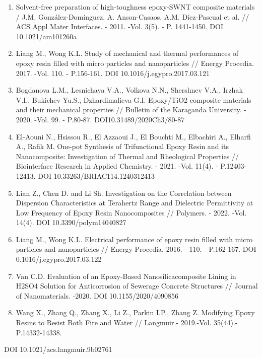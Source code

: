 \begin{enumerate}
\def\labelenumi{\arabic{enumi}.}
\setcounter{enumi}{4}
\item
  Solvent-free preparation of high-toughness epoxy-SWNT composite
  materials / J.M. González-Domínguez, A. Anson-Casaos, A.M.
  Díez-Pascual et al. // ACS Appl Mater Interfaces. - 2011. -Vol. 3(5).
  - P. 1441-1450. DOI 10.1021/am101260a
\item
  Liang M., Wong K.L. Study of mechanical and thermal performances of
  epoxy resin filled with micro particles and nanoparticles // Energy
  Procedia. 2017. -Vol. 110. - P.156-161. DOI
  10.1016/j.egypro.2017.03.121
\item
  Bogdanova L.M., Lesnichaya V.A., Volkova N.N., Shershnev V.A., Irzhak
  V.I., Bukichev Yu.S., Dzhardimalieva G.I. Epoxy/TiO2 composite
  materials and their mechanical properties // Bulletin of the Karaganda
  University. - 2020. -Vol. 99. - P.80-87. DOI10.31489/2020Ch3/80-87
\item
  El-Aouni N., Hsissou R., El Azzaoui J., El Bouchti M., Elbachiri A.,
  Elharfi A., Rafik M. One-pot Synthesis of Trifunctional Epoxy Resin
  and its Nanocomposite: Investigation of Thermal and Rheological
  Properties // Biointerface Research in Applied Chemistry. - 2021.
  -Vol. 11(4). - P.12403-12413. DOI 10.33263/BRIAC114.1240312413
\item
  Lian Z., Chen D. and Li Sh. Investigation on the Correlation between
  Dispersion Characteristics at Terahertz Range and Dielectric
  Permittivity at Low Frequency of Epoxy Resin Nanocomposites //
  Polymers. - 2022. -Vol. 14(4). DOI 10.3390/polym14040827
\item
  Liang M., Wong K.L. Electrical performance of epoxy resin filled with
  micro particles and nanoparticles // Energy Procedia. 2016. - 110. -
  P.162-167. DOI 0.1016/j.egypro.2017.03.122
\item
  Van C.D. Evaluation of an Epoxy-Based Nanosilicacomposite Lining in
  H2SO4 Solution for Anticorrosion of Sewerage Concrete Structures //
  Journal of Nanomaterials. -2020. DOI 10.1155/2020/4090856
\item
  Wang X., Zhang Q., Zhang X., Li Z., Parkin I.P., Zhang Z. Modifying
  Epoxy Resins to Resist Both Fire and Water // Langmuir.- 2019.-Vol.
  35(44).- P.14332-14338.
\end{enumerate}

DOI 10.1021/acs.langmuir.9b02761


